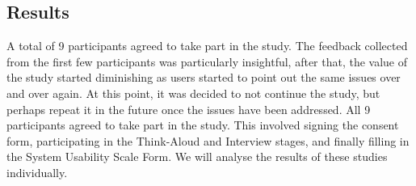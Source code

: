 \subsection{Results}
A total of 9 participants agreed to take part in the study. The feedback collected from the first few participants was particularly insightful, after that, the value of the study started diminishing as users started to point out the same issues over and over again. At this point, it was decided to not continue the study, but perhaps repeat it in the future once the issues have been addressed. All 9 participants agreed to take part in the study. This involved signing the consent form, participating in the Think-Aloud and Interview stages, and finally filling in the System Usability Scale Form. We will analyse the results of these studies individually.

